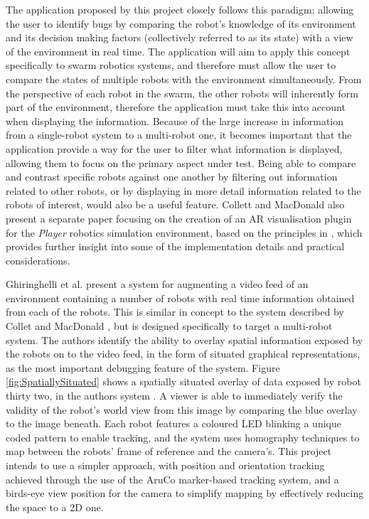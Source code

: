 \documentclass[titlepage,hidelinks,10pt]{article}
\begin{document}
The application proposed by this project closely follows this paradigm; allowing the user to identify bugs by comparing the robot's knowledge of its environment and its decision making factors (collectively referred to as its state) with a view of the environment in real time. The application will aim to apply this concept specifically to swarm robotics systems, and therefore must allow the user to compare the states of multiple robots with the environment simultaneously. From the perspective of each robot in the swarm, the other robots will inherently form part of the environment, therefore the application must take this into account when displaying the information. Because of the large increase in information from a single-robot system to a multi-robot one, it becomes important that the application provide a way for the user to filter what information is displayed, allowing them to focus on the primary aspect under test. Being able to compare and contrast specific robots against one another by filtering out information related to other robots, or by displaying in more detail information related to the robots of interest, would also be a useful feature. Collett and MacDonald also present a separate paper \cite{ARForPlayer} focusing on the creation of an AR visualisation plugin for the \textit{Player} \cite{Player} robotics simulation environment, based on the principles in  \cite{AugmentedRealityDebuggingSystem}, which provides further insight into some of the implementation details and practical considerations.

Ghiringhelli \cite{LEDSwarmAR} et al. present a system for augmenting a video feed of an environment containing a number of robots with real time information obtained from each of the robots. This is similar in concept to the system described by Collet and MacDonald \cite{AugmentedRealityDebuggingSystem}, but is designed specifically to target a multi-robot system. The authors identify the ability to overlay spatial information exposed by the robots on to the video feed, in the form of situated graphical representations, as the most important debugging feature of the system. Figure \ref{fig:SpatiallySituated} shows a spatially situated overlay of data exposed by robot thirty two, in the authors system \cite{LEDSwarmAR}. A viewer is able to immediately verify the validity of the robot's world view from this image by comparing the blue overlay to the image beneath. Each robot features a coloured LED blinking a unique coded pattern to enable tracking, and the system uses homography techniques to map between the robots' frame of reference and the camera's. This project intends to use a simpler approach, with position and orientation tracking achieved through the use of the AruCo \cite{AruCo} marker-based tracking system, and a birds-eye view position for the camera to simplify mapping by effectively reducing the space to a 2D one.
\end{document}

